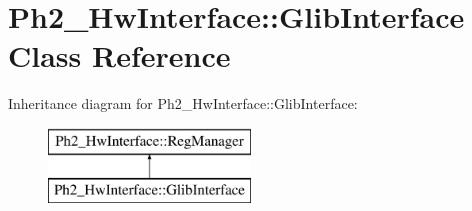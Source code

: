 \hypertarget{class_ph2___hw_interface_1_1_glib_interface}{\section{Ph2\-\_\-\-Hw\-Interface\-:\-:Glib\-Interface Class Reference}
\label{class_ph2___hw_interface_1_1_glib_interface}
}
Inheritance diagram for Ph2\-\_\-\-Hw\-Interface\-:\-:Glib\-Interface\-:\begin{figure}[H]
\begin{center}
\leavevmode
\includegraphics[height=2.000000cm]{class_ph2___hw_interface_1_1_glib_interface}
\end{center}
\end{figure}
